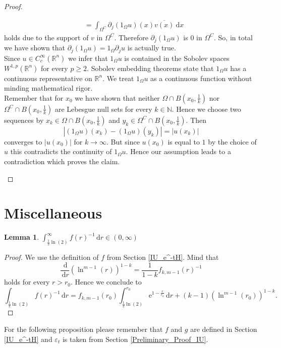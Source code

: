 \documentclass[12pt,longbibliography]{article}
\def\N{\mathbb{N}}
\def\R{\mathbb{R}}
\def\d{\,\mathrm{d}}
\newtheorem{lem}[thm]{Lemma}
\theoremstyle{definition}
\theoremstyle{remark}
\theoremstyle{example}
\begin{document}
\begin{proof}
\begin{enumerate}[i.)]
\begin{align*}
& = \int_{\Omega^{C}} \partial_{j}(1_{\Omega} u)(x) \overline{v(x)} \ \mathrm{d}x 
\end{align*}
holds due to the support of $v$ in $\Omega^{C}$. Therefore $\partial_{j}(1_{\Omega} u)$ is $0$ in $\Omega^{C}$. So, 
in total we have shown that $\partial_{j} (1_{\Omega} u) = 1_{\Omega} \partial_{j}u$ is actually true.\\
Since $u \in C_{c}^{\infty}(\R^{n})$ we infer that $1_{\Omega} u$ is contained in the Sobolev spaces 
$W^{1,p}(\R^{n})$ for every $p \geq 2$. Sobolev embedding theorems state that $1_{\Omega} u$ has a 
continuous representative on $\R^{n}$. We treat $1_{\Omega} u$ as a continuous function without minding mathematical rigor.\\

Remember that for $x_{0}$ we have shown that neither $\Omega \cap B(x_{0},\frac{1}{k})$ nor $\Omega^{C} \cap B(x_{0},\frac{1}{k})$
are Lebesgue null sets for every $k \in \N$. Hence we choose two sequences by
$x_{k} \in \Omega \cap B(x_{0},\frac{1}{k})$ and $y_{k} \in \Omega^{C} \cap B(x_{0},\frac{1}{k})$. Then 
$$ 
|(1_{\Omega} u)(x_{k}) -  (1_{\Omega} u)(y_{k})| = |u(x_{k})|
$$
converges to $|u(x_{0})|$ for $k \to \infty$. But since $u(x_{0})$ is equal to $1$ by the choice of $u$ this contradicts the 
continuity of $1_{\Omega} u$. Hence our assumption leads to a contradiction which proves the claim.
\end{enumerate}
\end{proof}

\section{Miscellaneous}\label{Miscellaneous}

\begin{lem}
$\int_{\frac{1}{2}\ln(2)}^{\infty} f(r)^{-1} \d r \in (0,\infty)$
\end{lem}

\begin{proof}
We use the definition of $f$ from Section \ref{IU_e^-tH}. Mind that 
$$
\frac{\d}{\d r} \left( \ln^{m-1} (r) \right)^{1-k} = \frac{1}{1-k} f_{k, m-1} (r)^{-1}
$$
holds for every $r > r_{0}$. Hence we conclude to
$$
\int_{\frac{1}{2}\ln(2)} f(r)^{-1} \d r = f_{k, m-1} ( r_{0} ) \int_{\frac{1}{2}\ln(2)}^{r_{0}} \mathrm{e}^{1-\frac{r}{r_{0}}} \d r
+ (k-1) \left( \ln^{m-1} (r_{0}) \right)^{1-k}.
$$
\end{proof}

For the following proposition please remember that $f$ and $g$ are defined in Section \ref{IU_e^-tH} and 
$\varepsilon_{t}$ is taken from Section \ref{Preliminary_Proof_IU}.
\end{document}
